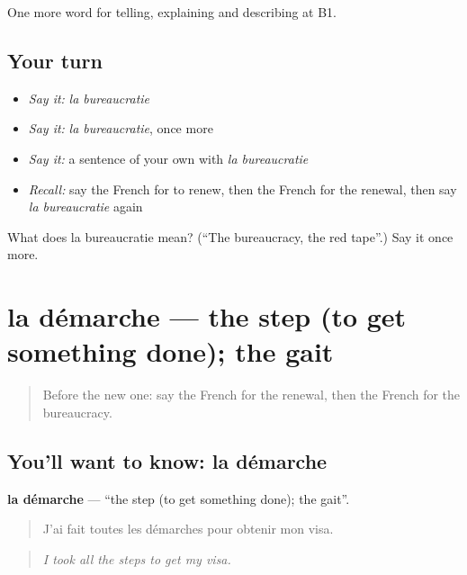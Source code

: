 \begin{grammarlens}[title={What you've built}]
One more word for telling, explaining and describing at B1.
\end{grammarlens}

\subsection*{Your turn}
\begin{itemize}
\raggedright
  \item \emph{Say it:} \emph{la bureaucratie}
  \item \emph{Say it:} \emph{la bureaucratie}, once more
  \item \emph{Say it:} a sentence of your own with \emph{la bureaucratie}
  \item \emph{Recall:} say the French for to renew, then the French for the renewal, then say \emph{la bureaucratie} again
\end{itemize}

\begin{tcolorbox}[breakable,colback=teal!4,colframe=teal!35!black,title={Before you move on}]
What does la bureaucratie mean? (\textquotedblleft{}The bureaucracy, the red tape\textquotedblright{}.) Say it once more.
\end{tcolorbox}
\section[la démarche]{la démarche — the step (to get something done); the gait}

\label{lesson:FR-C385-demarche}



\begin{quote}
Before the new one: say the French for the renewal, then the French for the bureaucracy.
\end{quote}

\subsection*{You'll want to know: la démarche}
\textbf{la démarche} — \textquotedblleft{}the step (to get something done); the gait\textquotedblright{}.

\begin{quote}
J'ai fait toutes les démarches pour obtenir mon visa.
\end{quote}

\begin{quote}
\emph{I took all the steps to get my visa.}
\end{quote}

